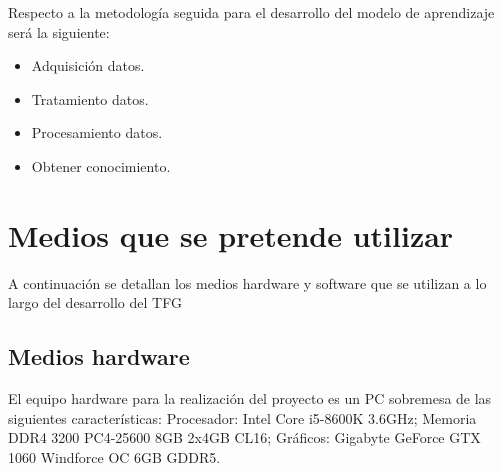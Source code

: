 \documentclass[11pt,a4paper,twoside,final]{article}
\begin{document}
Respecto a la metodología seguida para el desarrollo del modelo de aprendizaje será la siguiente:
\begin{itemize}
  \setlength\itemsep{1pt}
  \item Adquisición datos.
  \item Tratamiento datos.
  \item Procesamiento datos.
  \item Obtener conocimiento.
\end{itemize}

\newpage
\section{Medios que se pretende utilizar}
A continuación se detallan los medios hardware y software que se utilizan a lo largo del desarrollo del TFG

\subsection{Medios hardware}
El equipo hardware para la realización del proyecto es un PC sobremesa de las siguientes características:
 Procesador: Intel Core i5-8600K 3.6GHz; Memoria DDR4 3200 PC4-25600 8GB 2x4GB CL16; Gráficos: Gigabyte
 GeForce GTX 1060 Windforce OC 6GB GDDR5.
\end{document}
